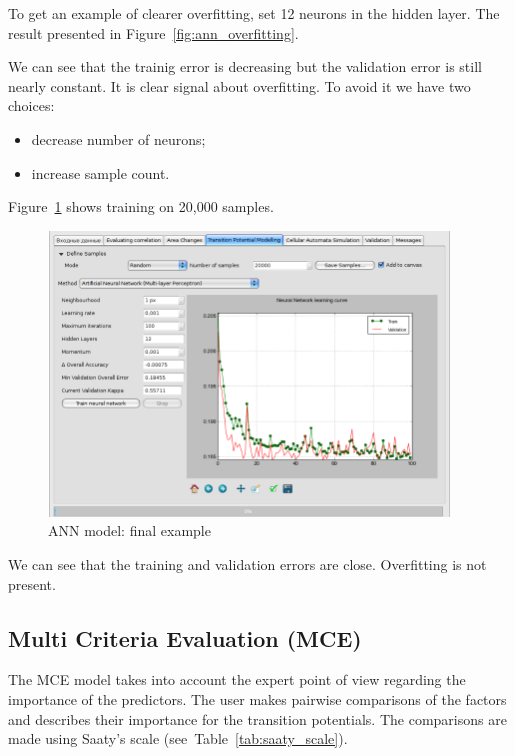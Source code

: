 \documentclass{report}
\begin{document}
To get an example of clearer overfitting, set 12 neurons in the hidden layer. 
The result presented in Figure~\ref{fig:ann_overfitting}.

We can see that the trainig error is decreasing but the validation error is still nearly constant. It is clear signal about overfitting.
To avoid it we have two choices:
\begin{itemize}
    \item decrease number of neurons;
    \item increase sample count.
\end{itemize}

Figure~\ref{fig:ann_final} shows training on 20,000 samples.

\begin{figure}[h!]
\centering
\includegraphics[width=0.95\textwidth]{img/ann_final.png}
\caption{ANN model: final example}
\label{fig:ann_final}
\end{figure}

We can see that the training and validation errors are close. Overfitting is not present.

\subsection{Multi Criteria Evaluation (MCE)}

The MCE model \cite{eastman1999multi} takes into account the expert point of view regarding the importance of the predictors. 
The user makes pairwise comparisons of the factors and describes their importance for the transition potentials. 
The comparisons are made using Saaty's scale (see~Table~\ref{tab:saaty_scale}).
\end{document}
